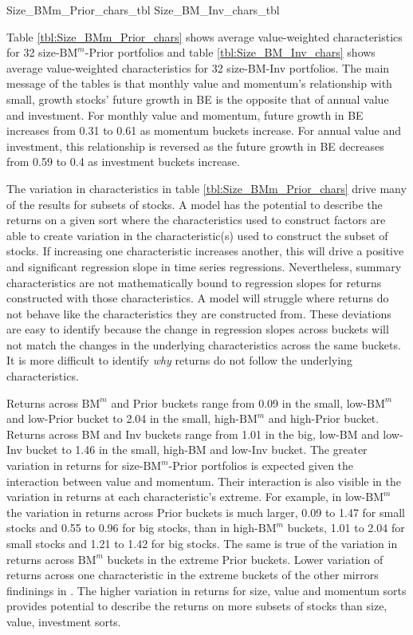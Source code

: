 
{Size_BMm_Prior_chars_tbl}
{Size_BM_Inv_chars_tbl}

Table \ref{tbl:Size_BMm_Prior_chars} shows average value-weighted
characteristics for 32 size-$\text{BM}^m$-Prior portfolios and table
\ref{tbl:Size_BM_Inv_chars} shows average value-weighted characteristics for 32
size-BM-Inv portfolios. The main message of the tables is that monthly value
and momentum's relationship with small, growth stocks' future growth in BE is
the opposite that of annual value and investment. For monthly value and
momentum, future growth in BE increases from 0.31 to 0.61 as momentum buckets
increase. For annual value and investment, this relationship is reversed as the
future growth in BE decreases from 0.59 to 0.4 as investment buckets increase.

The variation in characteristics in table \ref{tbl:Size_BMm_Prior_chars} drive
many of the results for subsets of stocks.
A model has the potential to describe the
returns on a given sort where the characteristics used to construct factors are
able to create variation in the characteristic(s) used to construct the subset
of stocks. If increasing one characteristic increases another, this will drive
a positive and significant regression slope in time series regressions.
Nevertheless, summary characteristics are not mathematically bound to
regression slopes for returns constructed with those characteristics.
A model will struggle where returns do not behave like the characteristics they
are constructed from.
These deviations are easy to identify because the change in
regression slopes across buckets will not match the changes in the underlying
characteristics across the same buckets. It is more difficult to identify
\emph{why} returns do not follow the underlying characteristics.

Returns across $\text{BM}^m$ and Prior buckets range from 0.09 in the small,
low-$\text{BM}^m$ and low-Prior bucket to 2.04 in the small, high-$\text{BM}^m$
and high-Prior bucket. Returns across BM and Inv buckets range from 1.01 in the
big, low-BM and low-Inv bucket to 1.46 in the small, high-BM and low-Inv
bucket. The greater variation in returns for size-$\text{BM}^m$-Prior
portfolios is expected given the interaction between value and momentum. Their
interaction is also visible in the variation in returns at each
characteristic's extreme. For example, in low-$\text{BM}^m$ the variation in
returns across Prior buckets is much larger, 0.09 to 1.47 for small stocks and
0.55 to 0.96 for big stocks, than in high-$\text{BM}^m$ buckets, 1.01 to 2.04
for small stocks and 1.21 to 1.42 for big stocks. The same is true of the
variation in returns across $\text{BM}^m$ buckets in the extreme Prior buckets.
Lower variation of returns across one characteristic in the extreme buckets of
the other mirrors findinings in \textcite{asness2013devil}. The higher
variation in returns for size, value and momentum sorts provides potential to
describe the returns on more subsets of stocks than size, value, investment
sorts.

